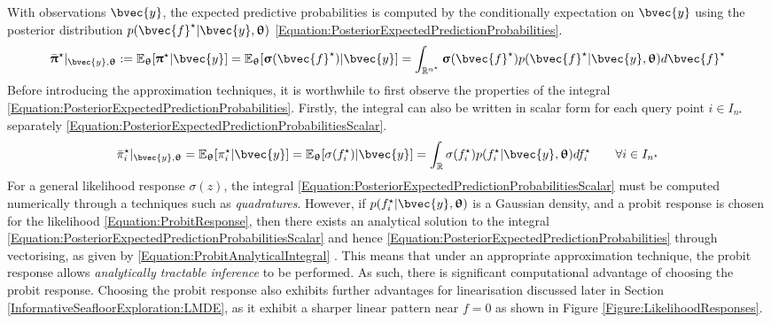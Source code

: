 				With observations $\bvec{y}$, the expected predictive probabilities is computed by the conditionally expectation on $\bvec{y}$ using the posterior distribution $p(\bvec{f}^{\star} | \bvec{y}, \vec{\uptheta})$ \eqref{Equation:PosteriorExpectedPredictionProbabilities}. \begin{equation}
					\bar{\vec{\uppi}}^{\star} |_{\bvec{y}, \vec{\uptheta}} := \mathbb{E}_{\vec{\uptheta}}[\vec{\uppi}^{\star} | \bvec{y}] = \mathbb{E}_{\vec{\uptheta}}[\vec{\upsigma}(\bvec{f}^{\star}) | \bvec{y}] = \int_{\mathbb{R}^{n^{\star}}} \vec{\upsigma}(\bvec{f}^{\star}) p(\bvec{f}^{\star} | \bvec{y}, \vec{\uptheta}) d \bvec{f}^{\star}
				\label{Equation:PosteriorExpectedPredictionProbabilities}
				\end{equation} Before introducing the approximation techniques, it is worthwhile to first observe the properties of the integral \eqref{Equation:PosteriorExpectedPredictionProbabilities}. Firstly, the integral can also be written in scalar form for each query point $i \in I_{n^{\star}}$ separately \eqref{Equation:PosteriorExpectedPredictionProbabilitiesScalar}. \begin{equation}
					 \bar{\pi}^{\star}_{i} |_{\bvec{y}, \vec{\uptheta}} = \mathbb{E}_{\vec{\uptheta}}[\pi^{\star}_{i} | \bvec{y}] = \mathbb{E}_{\vec{\uptheta}}[\sigma(f^{\star}_{i}) | \bvec{y}] = \int_{\mathbb{R}} \sigma(f^{\star}_{i}) p(f^{\star}_{i} | \bvec{y}, \vec{\uptheta}) d f^{\star}_{i} \qquad \forall i \in I_{n^{\star}}
				\label{Equation:PosteriorExpectedPredictionProbabilitiesScalar}
				\end{equation} For a general likelihood response $\sigma(z)$, the integral \eqref{Equation:PosteriorExpectedPredictionProbabilitiesScalar} must be computed numerically through a techniques such as \textit{quadratures}. However, if $p(f^{\star}_{i} | \bvec{y}, \vec{\uptheta})$ is a Gaussian density, and a probit response is chosen for the likelihood \eqref{Equation:ProbitResponse}, then there exists an analytical solution to the integral \eqref{Equation:PosteriorExpectedPredictionProbabilitiesScalar} and hence \eqref{Equation:PosteriorExpectedPredictionProbabilities} through vectorising, as given by \eqref{Equation:ProbitAnalyticalIntegral} \citep{GaussianProcessForMachineLearning}. This means that under an appropriate approximation technique, the probit response allows \textit{analytically tractable inference} to be performed. As such, there is significant computational advantage of choosing the probit response. Choosing the probit response also exhibits further advantages for linearisation discussed later in Section \ref{InformativeSeafloorExploration:LMDE}, as it exhibit a sharper linear pattern near $f = 0$ as shown in Figure \ref{Figure:LikelihoodResponses}. \begin{equation}

\end{equation}
